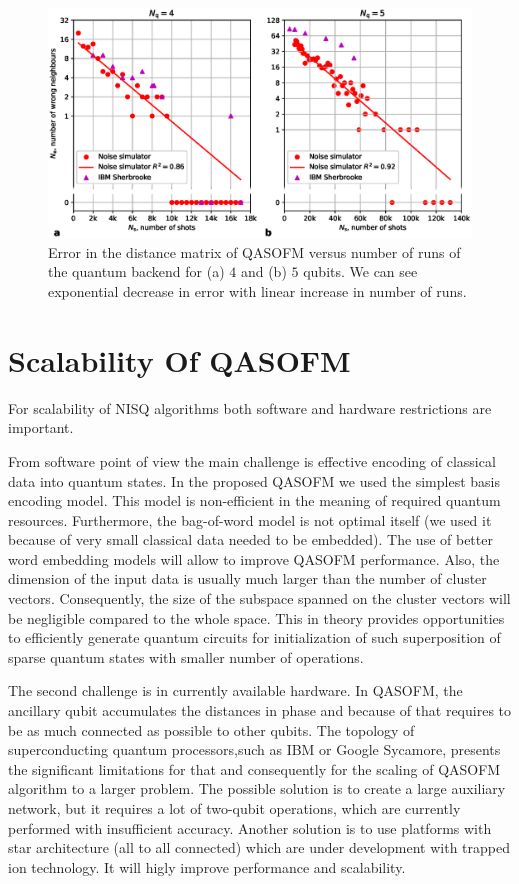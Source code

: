 \documentclass[pra,showkeys,twocolumn,showpacs,aps,10pt]{revtex4-1}
\begin{document}
\begin{figure}[t]
  \includegraphics[width=1.85\columnwidth]{tomography-errors-by-shots-n4-n5.eps}
  \caption{Error in the distance matrix of QASOFM versus number of runs of the quantum backend for (a) $4$ and (b) $5$ qubits. We can see exponential decrease in error with linear increase in number of runs. 
  }
  \label{fig:tomography-errors-by-shots-n4}
\end{figure}




\section{Scalability Of QASOFM}

For scalability of NISQ algorithms both software and hardware restrictions are important.

From software point of view the main challenge is effective encoding of classical data into quantum states. In the proposed QASOFM we used the simplest basis encoding model. This model is non-efficient in the meaning of required quantum resources. Furthermore, the bag-of-word model is not optimal itself (we used it because of very small classical data needed to be embedded). The use of better word embedding models will allow to improve QASOFM performance. Also, the dimension of the input data is usually much larger than the number of cluster vectors. Consequently, the size of the subspace spanned on the cluster vectors will be negligible compared to the whole space. This in theory provides opportunities to efficiently generate quantum circuits for initialization of such superposition of sparse quantum states with smaller number of operations.

The second challenge is in currently available hardware.
In QASOFM, the ancillary qubit  accumulates the distances in phase and because of that requires to be as much connected as possible to other qubits. The topology of superconducting quantum processors,such as IBM or Google Sycamore, presents the significant limitations for that and consequently for the scaling of QASOFM algorithm to a larger problem.
The possible solution is to create a large auxiliary network,
but it requires a lot of two-qubit operations,
which are currently performed with insufficient accuracy.
Another solution is to use platforms with star architecture (all to all connected) which are under development with trapped ion technology\cite{QuantinuumsHSeriesHits}. It will higly improve performance and scalability. 
\end{document}
